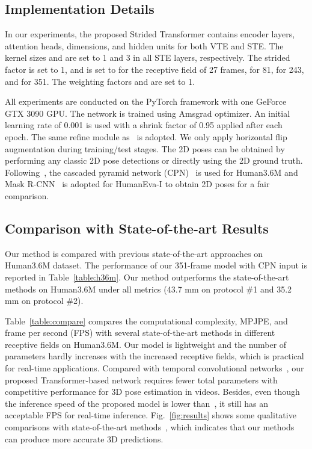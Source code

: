 \documentclass[journal]{IEEEtran}
\begin{document}
\subsection{Implementation Details}
In our experiments, the proposed Strided Transformer contains  encoder layers,  attention heads,  dimensions, and  hidden units for both VTE and STE. 
The kernel sizes  and  are set to 1 and 3 in all STE layers, respectively. 
The strided factor  is set to 1, and  is set to  for the receptive field of 27 frames,  for 81,  for 243, and  for 351. 
The weighting factors  and  are set to 1. 

All experiments are conducted on the PyTorch framework with one GeForce GTX 3090 GPU.
The network is trained using Amsgrad optimizer. 
An initial learning rate of 0.001 is used with a shrink factor of 0.95  applied after each epoch. 
The same refine module as~\cite{cai2019exploiting,wang2020motion} is adopted. 
We only apply horizontal flip augmentation during training/test stages. 
The 2D poses can be obtained by performing any classic 2D pose detections or directly using the 2D ground truth. 
Following~\cite{pavllo20193d,cheng2019occlusion}, the cascaded pyramid network (CPN)~\cite{chen2018cascaded} is used for Human3.6M and Mask R-CNN~\cite{he2017mask} is adopted for HumanEva-I to obtain 2D poses for a fair comparison.

\subsection{Comparison with State-of-the-art Results}
Our method is compared with previous state-of-the-art approaches on Human3.6M dataset. 
The performance of our 351-frame model with CPN input is reported in Table~\ref{table:h36m}. 
Our method outperforms the state-of-the-art methods on Human3.6M under all metrics (43.7 mm on protocol \#1 and 35.2 mm on protocol \#2). 

Table~\ref{table:compare} compares the computational complexity, MPJPE, and frame per second (FPS) with several state-of-the-art methods in different receptive fields on Human3.6M. 
Our model is lightweight and the number of parameters hardly increases with the increased receptive fields, which is practical for real-time applications. 
Compared with temporal convolutional networks~\cite{pavllo20193d,chen2021anatomy}, our proposed Transformer-based network requires fewer total parameters with competitive performance for 3D pose estimation in videos. 
Besides, even though the inference speed of the proposed model is lower than~\cite{pavllo20193d,chen2021anatomy}, it still has an acceptable FPS for real-time inference. 
Fig.~\ref{fig:results} shows some qualitative comparisons with state-of-the-art methods~\cite{pavllo20193d,liu2020attention}, which indicates that our methods can produce more accurate 3D predictions. 
\end{document}
